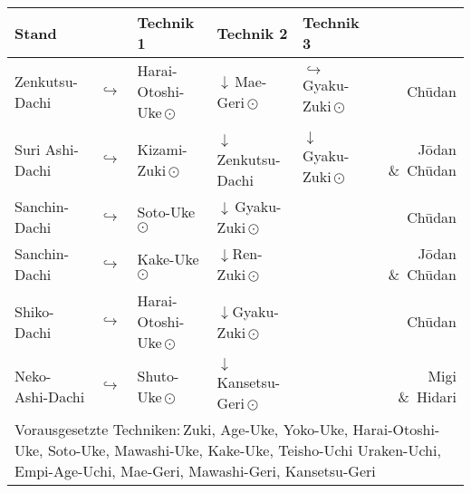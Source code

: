 \begin{tcolorbox}[width=\textwidth,height=\textheight,right=12pt,left=12pt,colframe=BRBELT,colback=white,fonttitle=\bfseries,coltitle=white,title=2. Kyu:\indent Kihon-Ido Kata - Partnerformen - Erwartungshorizont]	
	\null\vfill\null
	\begin{tabularx}{\textwidth}{llllXr}
		\textbf{Stand} 	&  	& \textbf{Technik 1} & \textbf{Technik 2} 				& \textbf{Technik 3}&\\
		\midrule
		Zenkutsu-Dachi 	& \(\hookrightarrow\)	& Harai-Otoshi-Uke\,\(\odot\) 	& \(\downarrow\)\,Mae-Geri\,\(\odot\)	& \(\hookrightarrow\) 	 Gyaku-Zuki\,\(\odot\)	& Ch\={u}dan \\
		Suri Ashi-Dachi	& \(\hookrightarrow\)	& Kizami-Zuki\,\(\odot\)		& \(\downarrow\)\,Zenkutsu-Dachi & \(\downarrow\)	 Gyaku-Zuki\,\(\odot\)	& J\={o}dan \&~Ch\={u}dan \\
		Sanchin-Dachi 	& \(\hookrightarrow\)	& Soto-Uke\,\(\odot\) 			& \(\downarrow\)\,Gyaku-Zuki\,\(\odot\) 				&						&	 					 Ch\={u}dan \\
		Sanchin-Dachi 	& \(\hookrightarrow\)	& Kake-Uke\,\(\odot\) 			& \(\downarrow\)Ren-Zuki\,\(\odot\) 					&						& 						 J\={o}dan \&~Ch\={u}dan \\
		Shiko-Dachi 	& \(\hookrightarrow\)	& Harai-Otoshi-Uke\,\(\odot\) 	& \(\downarrow\)Gyaku-Zuki\,\(\odot\) 				&						& 						 Ch\={u}dan \\
		Neko-Ashi-Dachi	& \(\hookrightarrow\)	& Shuto-Uke\,\(\odot\) 			& \(\downarrow\)Kansetsu-Geri\,\(\odot\) 					&						& 						 Migi \&~Hidari  \\
		\multicolumn{6}{p{\linewidth-2\tabcolsep}}{{\footnotesize Vorausgesetzte Techniken:\,Zuki, Age-Uke, Yoko-Uke, Harai-Otoshi-Uke, Soto-Uke, Mawashi-Uke, Kake-Uke, Teisho-Uchi Uraken-Uchi, Empi-Age-Uchi, Mae-Geri, Mawashi-Geri, Kansetsu-Geri}}\\
		\midrule
	\end{tabularx}\
	\begin{center}

\end{center}
\end{tcolorbox}
